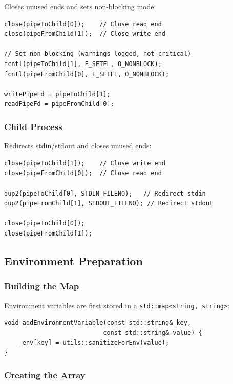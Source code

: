 \documentclass[11pt,a4paper]{article}
\begin{document}
Closes unused ends and sets non-blocking mode:

\begin{lstlisting}[caption=Parent Pipe Setup]
close(pipeToChild[0]);    // Close read end
close(pipeFromChild[1]);  // Close write end

// Set non-blocking (warnings logged, not critical)
fcntl(pipeToChild[1], F_SETFL, O_NONBLOCK);
fcntl(pipeFromChild[0], F_SETFL, O_NONBLOCK);

writePipeFd = pipeToChild[1];
readPipeFd = pipeFromChild[0];
\end{lstlisting}

\subsubsection{Child Process}

Redirects stdin/stdout and closes unused ends:

\begin{lstlisting}[caption=Child Pipe Setup]
close(pipeToChild[1]);    // Close write end
close(pipeFromChild[0]);  // Close read end

dup2(pipeToChild[0], STDIN_FILENO);   // Redirect stdin
dup2(pipeFromChild[1], STDOUT_FILENO); // Redirect stdout

close(pipeToChild[0]);
close(pipeFromChild[1]);
\end{lstlisting}

\subsection{Environment Preparation}

\subsubsection{Building the Map}

Environment variables are first stored in a \texttt{std::map<string, string>}:

\begin{lstlisting}[caption=Environment Map]
void addEnvironmentVariable(const std::string& key,
                           const std::string& value) {
    _env[key] = utils::sanitizeForEnv(value);
}
\end{lstlisting}

\subsubsection{Creating the Array}
\end{document}
